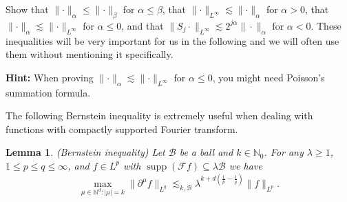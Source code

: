 \documentclass[a4paper,11pt]{article}
\newcommand{\cdummy}{\cdot}
\newcommand{\tmop}[1]{\ensuremath{\operatorname{#1}}}
\newcommand{\tmtextbf}[1]{{\bfseries{#1}}}
\newtheorem{lemma}{Lemma}
{\theorembodyfont{\rmfamily}\newtheorem{remark}{Remark}}
\newcommand{\CB}{\mathscr{B}}
\newcommand{\CF}{\mathscr{F}}
\begin{document}
\begin{exercise}\label{exercise:besov-space-inequalities}Show that $\lVert \cdummy
  \rVert_{\alpha} \leqslant \lVert \cdummy \rVert_{\beta}$ for $\alpha
  \leqslant \beta$, that $\lVert \cdummy \rVert_{L^{\infty}} \lesssim \lVert
  \cdummy \rVert_{\alpha}$ for $\alpha > 0$, that $\lVert \cdummy
  \rVert_{\alpha} \lesssim \lVert \cdummy \rVert_{L^{\infty}}$ for $\alpha
  \leqslant 0$, and that $\|S_j \cdummy \|_{L^{\infty}} \lesssim 2^{j \alpha}
  \| \cdummy \|_{\alpha}$ for $\alpha < 0$. These inequalities will be very important for us in the following and we will often use them without mentioning it specifically.
  
  \tmtextbf{Hint:} When proving $\lVert \cdummy \rVert_{\alpha} \lesssim
  \lVert \cdummy \rVert_{L^{\infty}}$ for $\alpha \leqslant 0$, you might need
  Poisson's summation formula.
\end{exercise}

The following Bernstein inequality is extremely useful when dealing with
functions with compactly supported Fourier transform.

\begin{lemma}
  \label{lemma:Bernstein}(Bernstein inequality) Let $\CB$ be a ball and $k \in
  \mathbb{N}_0$. For any $\lambda \geqslant 1$, $1 \leqslant p \leqslant q
  \leqslant \infty$, and $f \in L^p$ with $\tmop{supp} (\CF f) \subseteq
  \lambda \CB$ we have
  \[ \max_{{\mu} \in \mathbb{N}^d : |{\mu}| = k} \|
     \partial^{{\mu}} f\|_{L^q} \lesssim_{k, \CB} \lambda^{k + d (
     \frac{1}{p} - \frac{1}{q} )} \|f\|_{L^p} . \]
\end{lemma}
\end{document}
